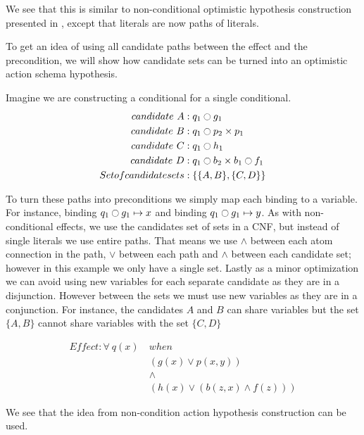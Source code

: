 \documentclass[\master/Master.tex]{subfiles}
\begin{document}
  	We see that this is similar to non-conditional optimistic hypothesis construction presented in , except that literals are now paths of literals.
  	
  	\begin{example}\label{ex:ca:opt-hyp-cons} To get an idea of using all candidate paths between the effect and the precondition, 
  		we will show how candidate sets can be turned into an optimistic action schema hypothesis.
  		
  		Imagine we are constructing a conditional for a single conditional.
  		\begin{align*}
  				candidate~ A &: q_1 \ocircle g_1  \\
  				candidate~ B &: q_1 \ocircle p_2 \times p_1  	\\			
  				candidate~ C &: q_1 \ocircle h_1 \\
  				candidate~ D &: q_1 \ocircle b_2 \times b_1 \ocircle  f_1\\
  				Set of candidate sets &: \left\{ \{ A, B \}, \{ C, D \}  \right\}
  		\end{align*}
  		
  		To turn these paths into preconditions we simply map each binding to a variable. 
  		For instance, binding $q_1 \ocircle g_1 \mapsto x$ and binding $q_1 \ocircle g_1 \mapsto y$.   		
  		As with non-conditional effects, we use the candidates set of sets in a CNF, but instead of single literals we use entire paths.
  		That means we use $\land$ between each atom connection in the path, $\lor$ between each path and $\land$ between each candidate set; however in this example we only have a single set.	
  		Lastly as a minor optimization we can avoid using new variables for each separate candidate as they are in a disjunction.
  		However between the sets we must use new variables as they are in a conjunction.
  		For instance, the candidates $A$ and $B$ can share variables but the set $\{A, B\}$ cannot share variables with  the set $\{C, D\}$
  		
  			\begin{align*}	
  				Effect: \forall ~q(x)~ & when ~ \\
   				&\left( g(x) \lor p(x,y) \right) \\
  				&\land \\
  				&\left( h(x) \lor \left( b(z,x) \land f(z)  \right) \right)
  			\end{align*}
  		
  		We see that the idea from non-condition action hypothesis construction can be used.
  		
  	\end{example}
  
\end{document}
